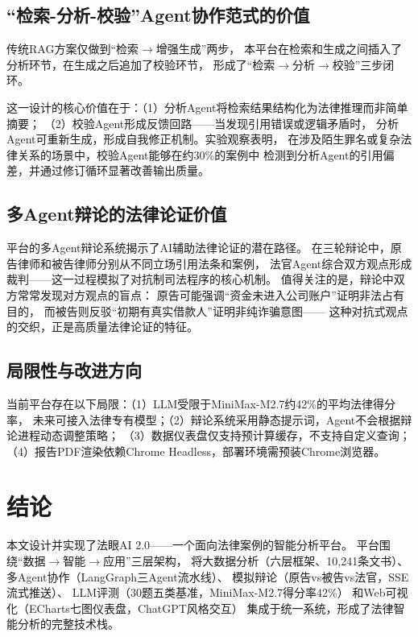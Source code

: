 \documentclass[12pt,a4paper,twoside]{ctexart}
\begin{document}
\subsection{``检索-分析-校验''Agent协作范式的价值}

传统RAG方案仅做到``检索$\rightarrow$增强生成''两步，
本平台在检索和生成之间插入了分析环节，在生成之后追加了校验环节，
形成了``检索$\rightarrow$分析$\rightarrow$校验''三步闭环。

这一设计的核心价值在于：（1）分析Agent将检索结果结构化为法律推理而非简单摘要；
（2）校验Agent形成反馈回路——当发现引用错误或逻辑矛盾时，
分析Agent可重新生成，形成自我修正机制。实验观察表明，
在涉及陌生罪名或复杂法律关系的场景中，校验Agent能够在约30\%的案例中
检测到分析Agent的引用偏差，并通过修订循环显著改善输出质量。

\subsection{多Agent辩论的法律论证价值}

平台的多Agent辩论系统揭示了AI辅助法律论证的潜在路径。
在三轮辩论中，原告律师和被告律师分别从不同立场引用法条和案例，
法官Agent综合双方观点形成裁判——这一过程模拟了对抗制司法程序的核心机制。
值得关注的是，辩论中双方常常发现对方观点的盲点：
原告可能强调``资金未进入公司账户''证明非法占有目的，
而被告则反驳``初期有真实借款人''证明非纯诈骗意图——
这种对抗式观点的交织，正是高质量法律论证的特征\cite{slonim2021}。

\subsection{局限性与改进方向}

当前平台存在以下局限：（1）LLM受限于MiniMax-M2.7约42\%的平均法律得分率，
未来可接入法律专有模型；（2）辩论系统采用静态提示词，Agent不会根据辩论进程动态调整策略；
（3）数据仪表盘仅支持预计算缓存，不支持自定义查询；
（4）报告PDF渲染依赖Chrome Headless，部署环境需预装Chrome浏览器。

\section{结论}

本文设计并实现了法眼AI 2.0——一个面向法律案例的智能分析平台。
平台围绕``数据$\rightarrow$智能$\rightarrow$应用''三层架构，
将大数据分析（六层框架、10,241条文书）、
多Agent协作（LangGraph三Agent流水线）、
模拟辩论（原告vs被告vs法官，SSE流式推送）、
LLM评测（30题五类基准，MiniMax-M2.7得分率42\%）
和Web可视化（ECharts七图仪表盘，ChatGPT风格交互）
集成于统一系统，形成了法律智能分析的完整技术栈。
\end{document}
